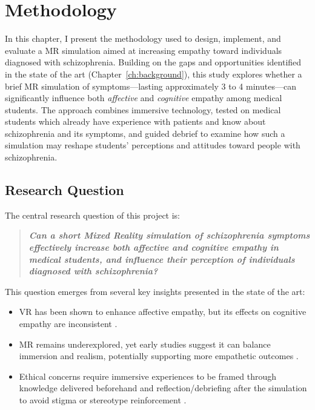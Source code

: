 \chapter{Methodology}
\label{ch:method}

In this chapter, I present the methodology used to design, implement, and evaluate a MR simulation aimed at increasing empathy toward individuals diagnosed with schizophrenia. Building on the gaps and opportunities identified in the state of the art (Chapter~\ref{ch:background}), this study explores whether a brief MR simulation of symptoms—lasting approximately 3 to 4 minutes—can significantly influence both \textit{affective} and \textit{cognitive} empathy among medical students. The approach combines immersive technology, tested on medical students which already have experience with patients and know about schizophrenia and its symptoms, and guided debrief to examine how such a simulation may reshape students' perceptions and attitudes toward people with schizophrenia.

\section{Research Question}

The central research question of this project is:

\begin{quote}
\textit{\textbf{Can a short Mixed Reality simulation of schizophrenia symptoms effectively increase both affective and cognitive empathy in medical students, and influence their perception of individuals diagnosed with schizophrenia?}}
\end{quote}

This question emerges from several key insights presented in the state of the art:

\begin{itemize}
    \item VR has been shown to enhance affective empathy, but its effects on cognitive empathy are inconsistent \cite{Martingano2021, Ventura2020}.
    \item MR remains underexplored, yet early studies suggest it can balance immersion and realism, potentially supporting more empathetic outcomes \cite{Silva2017, Krogmeier2024}.
    \item Ethical concerns require immersive experiences to be framed through knowledge delivered beforehand and reflection/debriefing after the simulation to avoid stigma or stereotype reinforcement \cite{Rueda2020, Ando2011}.
\end{itemize}

